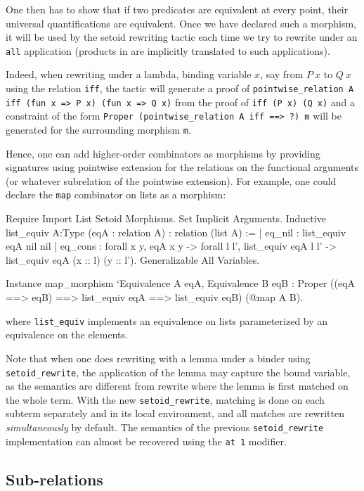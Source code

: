 One then has to show that if two predicates are equivalent at every
point, their universal quantifications are equivalent. Once we have
declared such a morphism, it will be used by the setoid rewriting tactic
each time we try to rewrite under an \texttt{all} application (products
in \Prop{} are implicitly translated to such applications).

Indeed, when rewriting under a lambda, binding variable $x$, say from
$P~x$ to $Q~x$ using the relation \texttt{iff}, the tactic will generate
a proof of \texttt{pointwise\_relation A iff (fun x => P x) (fun x => Q
x)} from the proof of \texttt{iff (P x) (Q x)} and a constraint of the
form \texttt{Proper (pointwise\_relation A iff ==> ?) m} will be
generated for the surrounding morphism \texttt{m}.

Hence, one can add higher-order combinators as morphisms by providing
signatures using pointwise extension for the relations on the functional
arguments (or whatever subrelation of the pointwise extension).
For example, one could declare the \texttt{map} combinator on lists as 
a morphism:
\begin{coq_eval}
Require Import List Setoid Morphisms.
Set Implicit Arguments.
Inductive list_equiv {A:Type} (eqA : relation A) : relation (list A) :=
| eq_nil : list_equiv eqA nil nil
| eq_cons : forall x y, eqA x y ->
  forall l l', list_equiv eqA l l' -> list_equiv eqA (x :: l) (y :: l').
Generalizable All Variables.
\end{coq_eval}
\begin{coq_example*}
Instance map_morphism `{Equivalence A eqA, Equivalence B eqB} :
  Proper ((eqA ==> eqB) ==> list_equiv eqA ==> list_equiv eqB) (@map A B).
\end{coq_example*}

where \texttt{list\_equiv} implements an equivalence on lists
parameterized by an equivalence on the elements.

Note that when one does rewriting with a lemma under a binder
using \texttt{setoid\_rewrite}, the application of the lemma may capture
the bound variable, as the semantics are different from rewrite where
the lemma is first matched on the whole term. With the new
\texttt{setoid\_rewrite}, matching is done on each subterm separately
and in its local environment, and all matches are rewritten
\emph{simultaneously} by default. The semantics of the previous
\texttt{setoid\_rewrite} implementation can almost be recovered using
the \texttt{at 1} modifier.

\subsection{Sub-relations}

